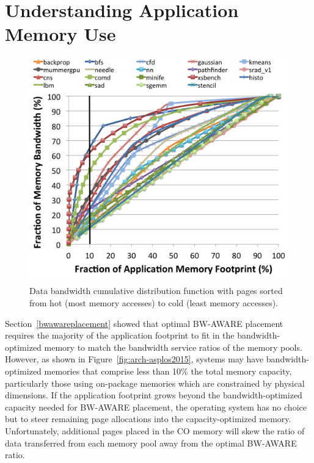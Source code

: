 \section{Understanding Application Memory Use}
\label{constrainedcapacity}

\begin{figure}[t]
    \centering
    \includegraphics[width=0.9\columnwidth]{asplos2015/figures/cdf.png} 
    \caption{Data bandwidth cumulative distribution function with pages sorted from hot (most memory accesses) to cold (least memory accesses).}
    \label{fig:cdf}
\end{figure}

Section~\ref{bwawareplacement} showed that optimal BW-AWARE placement requires
the majority of the application footprint to fit in the bandwidth-optimized memory
to match the bandwidth service ratios of the memory pools.
However, as shown in Figure~\ref{fig:arch-asplos2015}, systems may have bandwidth-optimized
memories that comprise less than 10\% the total memory capacity, particularly those using
on-package memories which are constrained by physical dimensions. If the application footprint
grows beyond the bandwidth-optimized capacity needed for BW-AWARE placement, the operating system
has no choice but to steer remaining page allocations into the capacity-optimized memory.
Unfortunately, additional pages placed in the CO memory will skew the
ratio of data transferred from each memory pool away from the optimal BW-AWARE ratio.

